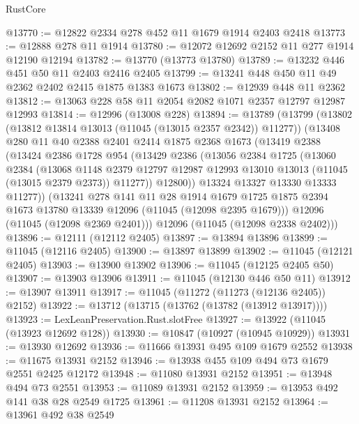 \begin{lexlean}{RustCore}
\begin{coremodule}
@13770 := @12822 @2334 @278 @452 @11 @1679 @1914 @2403 @2418
@13773 := @12888 @278 @11 @1914
@13780 := @12072 @12692 @2152 @11 @277 @1914 @12190 @12194
@13782 := @13770 (@13773 @13780)
@13789 := @13232 @446 @451 @50 @11 @2403 @2416 @2405
@13799 := @13241 @448 @450 @11 @49 @2362 @2402 @2415 @1875 @1383 @1673
@13802 := @12939 @448 @11 @2362
@13812 := @13063 @228 @58 @11 @2054 @2082 @1071 @2357 @12797 @12987 @12993
@13814 := @12996 (@13008 @228)
@13894 := @13789
    (@13799
      (@13802 (@13812 @13814 @13013 (@11045 (@13015 @2357 @2342)) @11277))
      (@13408
        @280
        @11
        @40
        @2388
        @2401
        @2414
        @1875
        @2368
        @1673
        (@13419
          @2388
          (@13424
            @2386
            @1728
            @954
            (@13429
              @2386
              (@13056
                @2384
                @1725
                (@13060
                  @2384
                  (@13068
                    @1148
                    @2379
                    @12797
                    @12987
                    @12993
                    @13010
                    @13013
                    (@11045 (@13015 @2379 @2373))
                    @11277))
                @12800))
            @13324
            @13327
            @13330
            @13333
            @11277))
        (@13241
          @278
          @141
          @11
          @28
          @1914
          @1679
          @1725
          @1875
          @2394
          @1673
          @13780
          @13339
          @12096
          (@11045 (@12098 @2395 @1679)))
        @12096
        (@11045 (@12098 @2369 @2401)))
      @12096
      (@11045 (@12098 @2338 @2402)))
@13896 := @12111 (@12112 @2405)
@13897 := @13894 @13896
@13899 := @11045 (@12116 @2405)
@13900 := @13897 @13899
@13902 := @11045 (@12121 @2405)
@13903 := @13900 @13902
@13906 := @11045 (@12125 @2405 @50)
@13907 := @13903 @13906
@13911 := @11045 (@12130 @446 @50 @11)
@13912 := @13907 @13911
@13917 := @11045 (@11272 (@11273 (@12136 @2405)) @2152)
@13922 := @13712 (@13715 (@13762 (@13782 (@13912 @13917))))
@13923 := LexLeanPreservation.Rust.slotFree
@13927 := @13922 (@11045 (@13923 @12692 @128))
@13930 := @10847 (@10927 (@10945 @10929))
@13931 := @13930 @12692
@13936 := @11666 @13931 @495 @109 @1679 @2552
@13938 := @11675 @13931 @2152
@13946 := @13938 @455 @109 @494 @73 @1679 @2551 @2425 @12172
@13948 := @11080 @13931 @2152
@13951 := @13948 @494 @73 @2551
@13953 := @11089 @13931 @2152
@13959 := @13953 @492 @141 @38 @28 @2549 @1725
@13961 := @11208 @13931 @2152
@13964 := @13961 @492 @38 @2549

\end{coremodule}
\end{lexlean}
